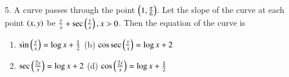 \documentclass[journal,12pt,twocolumn]{IEEEtran}
\theoremstyle{remark}
\begin{document}
5. A curve passes through the point \( \left(1,\frac{\pi}{6}\right) \). Let the slope of the curve at each point \( \left(x, y\right) \) be \( \frac{y}{x} + \sec\left(\frac{y}{x}\right), x > 0 \). Then the equation of the curve is 
\begin{enumerate}[label=(\alph*)]
    \item \( \sin\left(\frac{y}{x}\right) = \log x + \frac{1}{2} \) \quad(b) \( \cos\sec\left(\frac{y}{x}\right) = \log x + 2 \) 
    \item \( \sec\left(\frac{2y}{x}\right) = \log x + 2 \) \quad (d) \( \cos\left(\frac{2y}{x}\right) = \log x + \frac{1}{2} \)
\end{enumerate}
\end{document}
